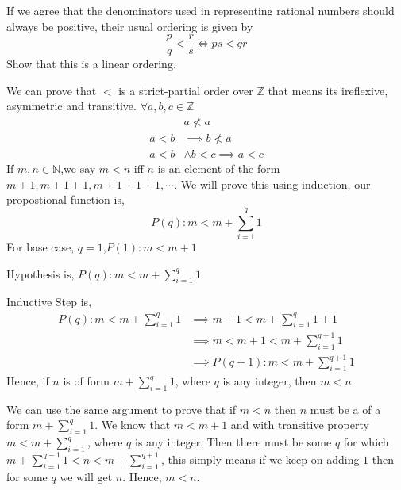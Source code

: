 \documentclass[addpoints]{exam}
\theoremstyle{mytheoremstyle}
\theoremstyle{mytheoremstyle}
\theoremstyle{myproblemstyle}
\begin{document}
\begin{questions}


	\question[1] If we agree that the denominators used in representing rational numbers should always be positive, their usual ordering is given by
	\[
		\frac{p}{q}<\frac{r}{s}\iff ps < qr
	\]
	Show that this is a linear ordering.
	\begin{solution}
		We can prove that \(<\) is a strict-partial order over \(\mathbb{Z}\) that means its ireflexive, asymmetric and transitive. \(\forall a,b,c\in\mathbb{Z}\)
		\begin{align*}
			      & a \nless a                 \\
			a < b & \implies b \nless a        \\
			a < b & \land b < c \implies a < c
		\end{align*}
		If \(m,n\in\mathbb{N}\),we say \(m<n\) iff \(n\) is an element of the form \(m+1,m+1+1,m+1+1+1,\cdots\). We will prove this using induction, our propostional function is,
		\[P(q):m<m+\sum_{i=1}^{q}1\]
		For base case, \(q=1\),\(P(1) : m<m+1\)

		Hypothesis is, \(\displaystyle P(q) : m<m+\sum_{i=1}^{q}1\)

		Inductive Step is,
		\begin{align*}
			P(q) : m<m+\sum_{i=1}^{q}1 & \implies m+1<m+\sum_{i=1}^{q}1+1      \\
			                           & \implies m<m+1<m+\sum_{i=1}^{q+1}1    \\
			                           & \implies P(q+1):m<m+\sum_{i=1}^{q+1}1
		\end{align*}
		Hence, if \(n\) is of form \(m+\sum_{i=1}^{q}1\), where \(q\) is any integer, then \(m<n\).

		We can use the same argument to prove that if \(m<n\) then \(n\) must be a of a form \(m+\sum_{i=1}^{q}1\). We know that \(m<m+1\) and with transitive property \(m<m+\sum_{i=1}^{q}\), where \(q\) is any integer. Then there must be some \(q\) for which \(m+\sum_{i=1}^{q-1}1<n<m+\sum_{i=1}^{q+1}\), this simply means if we keep on adding \(1\) then for some \(q\) we will get \(n\). Hence, \(m<n\).


\end{solution}
\end{questions}
\end{document}
